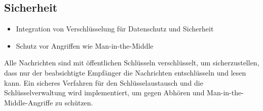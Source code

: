 \subsection{Sicherheit}

\begin{itemize}
    \item Integration von Verschlüsselung für Datenschutz und Sicherheit 
    \item Schutz vor Angriffen wie Man-in-the-Middle
\end{itemize}

Alle Nachrichten sind mit öffentlichen Schlüsseln verschlüsselt, um sicherzustellen, 
dass nur der beabsichtigte Empfänger die Nachrichten entschlüsseln und lesen kann.
Ein sicheres Verfahren für den Schlüsselaustausch und die Schlüsselverwaltung 
wird implementiert, um gegen Abhören und Man-in-the-Middle-Angriffe zu schützen.